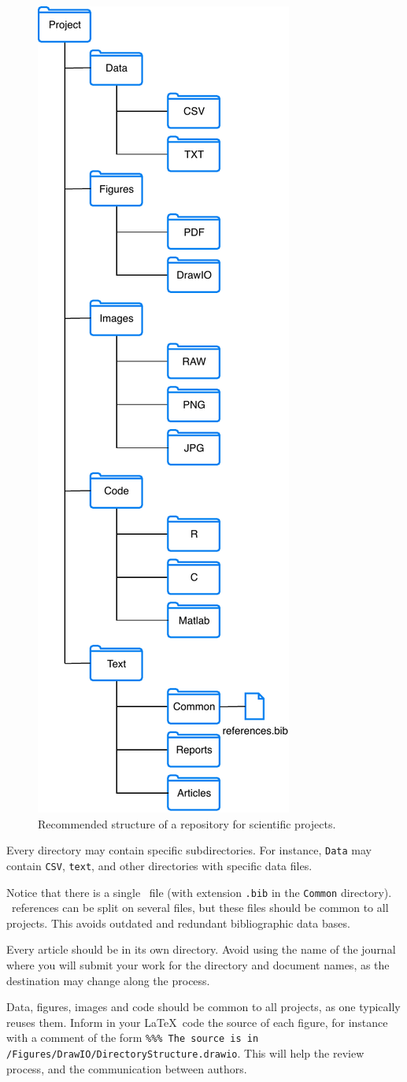 \documentclass[journal,twopage]{IEEEtran}
\begin{document}
\begin{figure}[hbt]
	\centering
	\includegraphics[width=.35\columnwidth]{DirectoryStructure}
	\caption{Recommended structure of a repository for scientific projects.}\label{Fig:StructRepo}
\end{figure}

Every directory may contain specific subdirectories.
For instance, \verb|Data| may contain \verb|CSV|, \verb|text|, and other directories with specific data files.

Notice that there is a single \BibTeX\ file (with extension \verb|.bib| in the \verb|Common| directory).
\BibTeX\ references can be split on several files, but these files should be common to all projects.
This avoids outdated and redundant bibliographic data bases.

Every article should be in its own directory.
Avoid using the name of the journal where you will submit your work for the directory and document names, as the destination may change along the process.

Data, figures, images and code should be common to all projects, as one typically reuses them.
Inform in your \LaTeX\ code the source of each figure, for instance with a comment of the form \texttt{\%\%\% The source is in /Figures/DrawIO/DirectoryStructure.drawio}.
This will help the review process, and the communication between authors.
\end{document}
